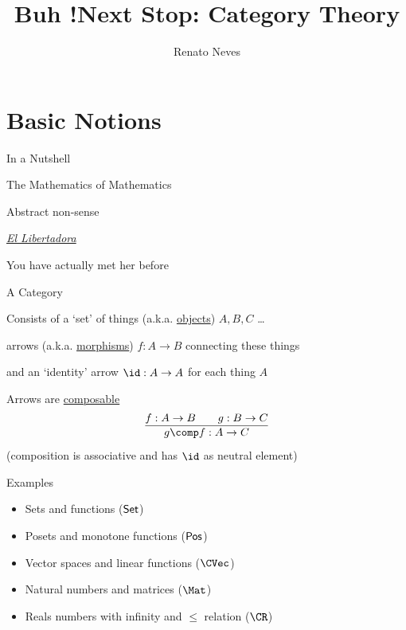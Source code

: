 \documentclass{beamer}
\author[Renato Neves]{Renato Neves}
\date{}
\begin{document}
\title{Buh !}
\frame[plain]{\titlepage}


\title{Next Stop: Category Theory}

\frame[plain]{\titlepage}

\section{Basic Notions}

\begin{frame}{In a Nutshell}

        The Mathematics of Mathematics

        \bigskip
        \pause
        Abstract non-sense

        \bigskip
        \pause
        \alert{\underline{\emph{El Libertadora}}}

        \bigskip
        \pause
        You have actually met her before
\end{frame}

\begin{frame}{A Category}

        Consists of a `set' of things (a.k.a. \alert{\underline{objects}}) $A,B,C$ \dots

        \medskip
        arrows (a.k.a. \alert{\underline{morphisms}}) $f : A \to B$ connecting these things

        \medskip
        and an `identity' arrow $\id : A \to A$ for each thing $A$

        \vfill
        \pause
        Arrows are \alert{\underline{composable}} \ie\
        \[
                \infer{
                        g \comp f : A \to C
                }{
                        f : A \to B \qquad g : B \to C}
        \]
        \pause
        (composition is associative and has $\id$ as neutral element)
\end{frame}

\begin{frame}{Examples}
        \begin{itemize}
                \item Sets and functions ($\mathsf{Set}$) \\[10pt]
                \item Posets and monotone functions ($\mathsf{Pos}$) \\[10pt]
                \item Vector spaces and linear functions ($\CVec$) \\[10pt]
                \item Natural numbers and matrices ($\Mat$) \\[10pt]
                \item Reals numbers with infinity and $\leq$ relation ($\CR$)  \\[10pt]
        \end{itemize}
\end{frame}
\end{document}
